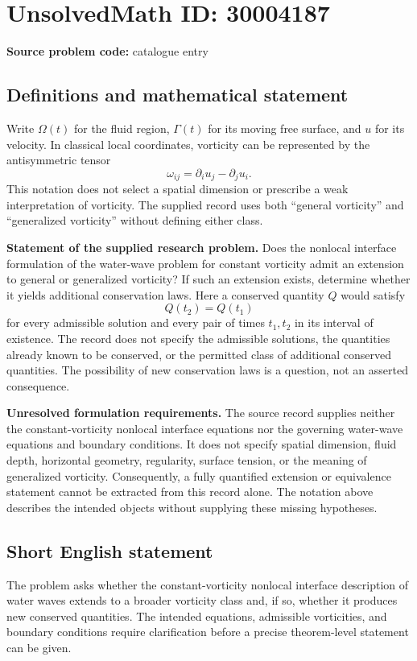 \documentclass[11pt]{article}
\begin{document}
\section*{UnsolvedMath ID: 30004187}
\textbf{Source problem code:} catalogue entry
\subsection{Definitions and mathematical statement}
Write \(\Omega(t)\) for the fluid region, \(\Gamma(t)\) for its moving free surface, and \(u\) for its velocity. In classical local coordinates, vorticity can be represented by the antisymmetric tensor
\[
\omega_{ij}=\partial_i u_j-\partial_j u_i.
\]
This notation does not select a spatial dimension or prescribe a weak interpretation of vorticity. The supplied record uses both ``general vorticity'' and ``generalized vorticity'' without defining either class.

\textbf{Statement of the supplied research problem.} Does the nonlocal interface formulation of the water-wave problem for constant vorticity admit an extension to general or generalized vorticity? If such an extension exists, determine whether it yields additional conservation laws. Here a conserved quantity \(Q\) would satisfy
\[
Q(t_2)=Q(t_1)
\]
for every admissible solution and every pair of times \(t_1,t_2\) in its interval of existence. The record does not specify the admissible solutions, the quantities already known to be conserved, or the permitted class of additional conserved quantities. The possibility of new conservation laws is a question, not an asserted consequence.

\textbf{Unresolved formulation requirements.} The source record supplies neither the constant-vorticity nonlocal interface equations nor the governing water-wave equations and boundary conditions. It does not specify spatial dimension, fluid depth, horizontal geometry, regularity, surface tension, or the meaning of generalized vorticity. Consequently, a fully quantified extension or equivalence statement cannot be extracted from this record alone. The notation above describes the intended objects without supplying these missing hypotheses.
\subsection{Short English statement}
The problem asks whether the constant-vorticity nonlocal interface description of water waves extends to a broader vorticity class and, if so, whether it produces new conserved quantities. The intended equations, admissible vorticities, and boundary conditions require clarification before a precise theorem-level statement can be given.
\end{document}
